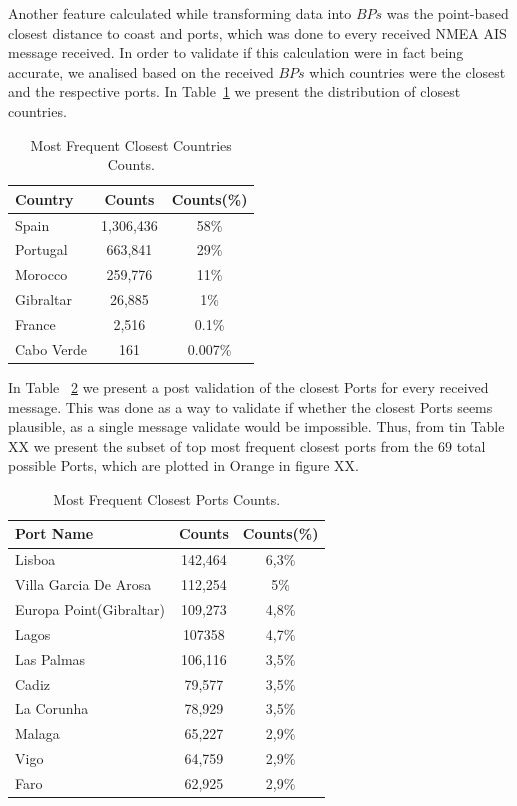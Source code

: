 Another feature calculated while transforming data into $BPs$ was the point-based closest distance to coast and ports, which was done to every received NMEA AIS message received. In order to validate if this calculation were in fact being accurate, we analised based on the received $BPs$ which countries were the closest and the respective ports.
In Table~\ref{Table: 5 Closest Countries} we present the distribution of closest countries. 
\begin{table}[H]
\centering
\caption{Most Frequent Closest Countries Counts.}
\label{Table: 5 Closest Countries}
\begin{tabular}{@{}lcc@{}}
\toprule
Country & Counts & Counts(\%) \\ \midrule
Spain & 1,306,436 & 58\% \\
Portugal & 663,841 & 29\% \\
Morocco & 259,776 & 11\% \\
Gibraltar & 26,885 & 1\% \\
France & 2,516 & 0.1\% \\
Cabo Verde & 161 & 0.007\% \\ \bottomrule
\end{tabular}
\end{table}
In Table ~\ref{Table: 5 Closest Ports} we present a post validation of the closest Ports for every received message. This was done as a way to validate if whether the closest Ports seems plausible, as a single message validate would be impossible. Thus, from tin Table XX we present the subset of top most frequent closest ports from the $69$ total possible Ports, which are plotted in Orange in figure XX.
\begin{table}[H]
\centering
\caption{Most Frequent Closest Ports Counts.}
\label{Table: 5 Closest Ports}
\begin{tabular}{@{}lcc@{}}
\toprule
Port Name & Counts & Counts(\%) \\ \midrule
Lisboa & 142,464 & 6,3\% \\
Villa Garcia De Arosa & 112,254 & 5\% \\
Europa Point(Gibraltar) & 109,273 & 4,8\% \\
Lagos & 107358 & 4,7\% \\
Las Palmas & 106,116 & 3,5\% \\
Cadiz & 79,577 & 3,5\% \\
La Corunha & 78,929 & 3,5\% \\
Malaga & 65,227 & 2,9\% \\
Vigo & 64,759 & 2,9\% \\
Faro & 62,925 & 2,9\% \\ \bottomrule
\end{tabular}
\end{table}

